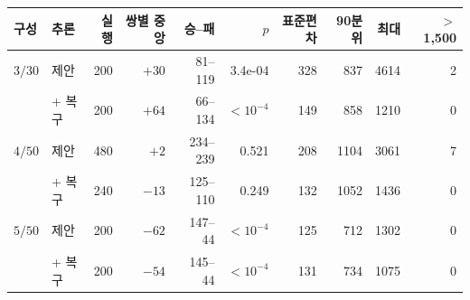 \begin{tabular}{llrrrrrrrr}
\toprule
구성 & 추론 & 실행 & 쌍별 중앙 & 승--패 & $p$ & 표준편차 & 90분위 & 최대 & $>$1{,}500 \\
\midrule
$3/30$ & 제안 & 200 & $+30$ & 81--119 & 3.4e-04 & 328 & 837 & 4614 & 2 \\
 & + 복구 & 200 & $+64$ & 66--134 & $<10^{-4}$ & 149 & 858 & 1210 & 0 \\
\addlinespace
$4/50$ & 제안 & 480 & $+2$ & 234--239 & 0.521 & 208 & 1104 & 3061 & 7 \\
 & + 복구 & 240 & $-13$ & 125--110 & 0.249 & 132 & 1052 & 1436 & 0 \\
\addlinespace
$5/50$ & 제안 & 200 & $-62$ & 147--44 & $<10^{-4}$ & 125 & 712 & 1302 & 0 \\
 & + 복구 & 200 & $-54$ & 145--44 & $<10^{-4}$ & 131 & 734 & 1075 & 0 \\
\bottomrule
\end{tabular}%
